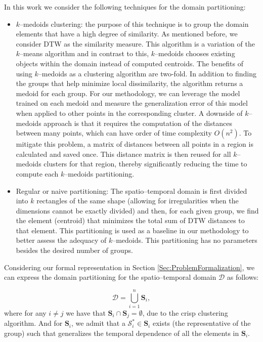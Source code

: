 In this work we consider the following techniques for the domain partitioning:

\begin{itemize}%
	\item $k$--medoids clustering: the purpose of this technique is to group the domain elements that have a high degree of similarity. As mentioned before, we consider DTW as the similarity measure. This algorithm is a variation of the $k$--means algorithm and in contrast to this, $k$--medoids chooses existing objects within the domain instead of computed centroids. The benefits of using $k$--medoids as a clustering algorithm are two-fold. In addition to finding the groups that help minimize local dissimilarity, the algorithm returns a medoid for each group. For our methodology, we can leverage the model trained on each medoid and measure the generalization error of this model when applied to other points in the corresponding cluster. A downside of $k$--medoids approach is that it requires the computation of the distances between many points, which can have order of time complexity $O(n^2)$. To mitigate this problem, a matrix of distances between all points in a region is calculated and saved once. This distance matrix is then reused for all $k$--medoids clusters for that region, thereby significantly reducing the time to compute each $k$--medoids partitioning.
	
	\item Regular or naive partitioning: The spatio--temporal domain is first divided into $k$ rectangles of the same shape (allowing for irregularities when the dimensions cannot be exactly divided) and then, for each given group, we find the element (centroid) that minimizes the total sum of DTW distances to that element. This partitioning is used as a baseline in our methodology to better assess the adequacy of $k$--medoids. This partitioning has no parameters besides the desired number of groups.
\end{itemize}

Considering our formal representation in Section \ref{Sec:ProblemFormalization}, we can express the domain partitioning for the spatio--temporal domain $\mathcal{D}$ as follows:

\begin{equation}
\mathcal{D} = \bigcup_{i=1}^{n} \mathbf{S}_{i},
\end{equation}
where for any $i\neq j$ we have that $\mathbf{S}_{i} \cap \mathbf{S}_{j} = \emptyset$, due to the crisp clustering algorithm. And for $\mathbf{S}_{i}$, we admit that a $\mathcal{S}_{i}^{*} \in \mathbf{S}_{i}$ exists (the representative of the group) such that generalizes the temporal dependence of all the elements in $\mathbf{S}_{i}$. 

